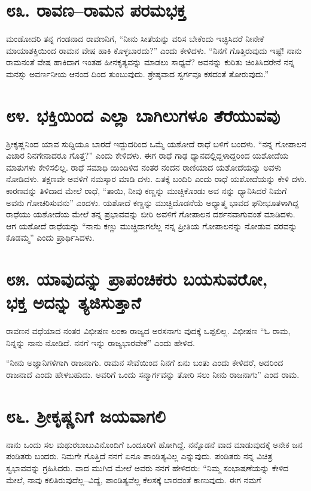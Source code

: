 \section{\num{೮೩.} ರಾವಣ–ರಾಮನ ಪರಮಭಕ್ತ}

ಮಂಡೋದರಿ ತನ್ನ ಗಂಡನಾದ ರಾವಣನಿಗೆ, “ನೀನು ಸೀತೆಯನ್ನು ವರಿಸ ಬೇಕೆಂದು ಇಚ್ಛಿಸಿದರೆ ನೀನೇಕೆ ಮಾಯಾಶಕ್ತಿಯಿಂದ ರಾಮನ ವೇಷ ಹಾಕಿ ಕೊಳ್ಳಬಾರದು?” ಎಂದು ಕೇಳಿದಳು. “ನಿನಗೆ ಗೊತ್ತಿರುವುದು ಇಷ್ಟೆ! ನಾನು ರಾಮನಂತೆ ವೇಷ ಹಾಕಿದಾಗ ಇಂತಹ ಹೀನಕೃತ್ಯವನ್ನು ಮಾಡಲು ಸಾಧ್ಯವೆ? ಅವನನ್ನು ಕುರಿತು ಚಿಂತಿಸಿದರೇನೆ ನನ್ನ ಮನಸ್ಸು ಅವರ್ಣನೀಯ ಆನಂದ ದಿಂದ ತುಂಬುವುದು. ಶ್ರೇಷ್ಠವಾದ ಸ್ವರ್ಗವೂ ಕಸದಂತೆ ತೋರುವುದು.”


\section{\num{೮೪. } ಭಕ್ತಿಯಿಂದ ಎಲ್ಲಾ ಬಾಗಿಲುಗಳೂ ತೆರೆಯುವವು}

ಶ್ರೀಕೃಷ್ಣನಿಂದ ಯಾವ ಸುದ್ದಿಯೂ ಬಾರದೆ ಇದ್ದುದರಿಂದ ಒಮ್ಮೆ ಯಶೋದೆ ರಾಧೆ ಬಳಿಗೆ ಬಂದಳು. “ನನ್ನ ಗೋಪಾಲನ ವಿಚಾರ ನಿನಗೇನಾದರೂ ಗೊತ್ತೆ?” ಎಂದು ಕೇಳಿದಳು. ಈಗ ರಾಧೆ ಗಾಢ ಧ್ಯಾನದಲ್ಲಿದ್ದಳಾದ್ದರಿಂದ ಯಶೋದೆಯ ಮಾತುಗಳು ಕೇಳಿಸಲಿಲ್ಲ. ರಾಧೆ ಸಮಾಧಿ ಯಿಂದಿಳಿದ ನಂತರ ನಂದನ ರಾಣಿಯಾದ ಯಶೋದೆಯನ್ನು ಅವಳು ನೋಡಿದಳು. ತಕ್ಷಣವೇ ಅವಳಿಗೆ ನಮಸ್ಕಾರ ಮಾಡಿ ದಳು. ಏತಕ್ಕೆ ಬಂದಿರಿ ಎಂದು ರಾಧೆ ಯಶೋದೆಯನ್ನು ಕೇಳಿ ದಳು. ಕಾರಣವನ್ನು ತಿಳಿದಾದ ಮೇಲೆ ರಾಧೆ, “ತಾಯಿ, ನೀವು ಕಣ್ಣನ್ನು ಮುಚ್ಚಿಕೊಂಡು ಅವ ನನ್ನು ಧ್ಯಾನಿಸಿದರೆ ನಿಮಗೆ ಅವನು ಗೋಚರಿಸುವನು” ಎಂದಳು. ಯಶೋದೆ ಕಣ್ಣನ್ನು ಮುಚ್ಚಿದೊಡನೆಯೆ ಅಧ್ಯಾತ್ಮ ಭಾವದ ಘನೀಭೂತಳಾಗಿದ್ದ ರಾಧೆಯು ಯಶೋದೆಯ ಮೇಲೆ ತನ್ನ ಪ್ರಭಾವವನ್ನು ಬೀರಿ ಅವಳಿಗೆ ಗೋಪಾಲನ ದರ್ಶನವಾಗುವಂತೆ ಮಾಡಿದಳು. ಆಗ ಯಶೋದೆ ರಾಧೆಯನ್ನು “ನಾನು ಕಣ್ಣು ಮುಚ್ಚಿದಾಗಲೆಲ್ಲ ನನ್ನ ಪ್ರೀತಿಯ ಗೋಪಾಲನನ್ನು ನೋಡುವ ವರವನ್ನು ಕೊಡಮ್ಮ” ಎಂದು ಪ್ರಾರ್ಥಿಸಿದಳು.


\section{\num{೮೫. } ಯಾವುದನ್ನು ಪ್ರಾಪಂಚಿಕರು ಬಯಸುವರೋ,\\ಭಕ್ತ ಅದನ್ನು ತ್ಯಜಿಸುತ್ತಾನೆ}

ರಾವಣನ ವಧೆಯಾದ ನಂತರ ವಿಭೀಷಣ ಲಂಕಾ ರಾಜ್ಯದ ಅರಸನಾಗು ವುದಕ್ಕೆ ಒಪ್ಪಲಿಲ್ಲ. ವಿಭೀಷಣ “ಓ ರಾಮ, ನಿನ್ನನ್ನು ನಾನು ನೋಡಿದೆ. ನನಗೆ ಇನ್ನು ರಾಜ್ಯಭಾರವೇಕೆ” ಎಂದು ಹೇಳಿದ.

“ನೀನು ಅಜ್ಞಾನಿಗಳಿಗಾಗಿ ರಾಜನಾಗು. ರಾಮನ ಸೇವೆಯಿಂದ ನಿನಗೆ ಏನು ಬಂತು ಎಂದು ಕೇಳಿದರೆ, ಅದರಿಂದ ರಾಜನಾದೆ ಎಂದು ಹೇಳಬಹುದು. ಅವರಿಗೆ ಒಂದು ಸನ್ಮಾರ್ಗವನ್ನು ತೋರಿ ಸಲು ನೀನು ರಾಜನಾಗು” ಎಂದ ರಾಮ.


\section{\num{೮೬. } ಶ್ರೀಕೃಷ್ಣನಿಗೆ ಜಯವಾಗಲಿ}

ನಾನು ಒಂದು ಸಲ ಮಥುರಬಾಬುವಿನೊಂದಿಗೆ ಒಂದೂರಿಗೆ ಹೋಗಿದ್ದೆ. ನನ್ನೊಡನೆ ವಾದ ಮಾಡುವುದಕ್ಕೆ ಅನೇಕ ಜನ ಪಂಡಿತರು ಬಂದರು. ನಿಮಗೇ ಗೊತ್ತಿದೆ ನನಗೆ ಏನೂ ಪಾಂಡಿತ್ಯವಿಲ್ಲ ಎನ್ನುವುದು. ಪಂಡಿತರು ನನ್ನ ವಿಚಿತ್ರ ಸ್ವಭಾವವನ್ನು ಗ್ರಹಿಸಿದರು. ವಾದ ಮುಗಿದ ಮೇಲೆ ಅವರು ನನಗೆ ಹೇಳಿದರು: “ನಿಮ್ಮ ಸಂಭಾಷಣೆಯನ್ನು ಕೇಳಿದ ಮೇಲೆ, ನಾವು ಕಲಿತಿರುವುದೆಲ್ಲ–ವಿದ್ಯೆ, ಪಾಂಡಿತ್ಯವೆಲ್ಲ ಕೆಲಸಕ್ಕೆ ಬಾರದಂತೆ ಕಾಣುವುದು. ಈಗ ನಮಗೆ

